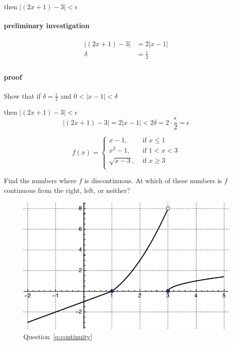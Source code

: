 \documentclass[letterpaper, landscape]{exam}
\begin{document}
\begin{questions}
\begin{solution}
        then $|(2x + 1) - 3| < \epsilon$

        \paragraph{preliminary investigation}
        \begin{align*}
          |(2x + 1) - 3| & = 2|x - 1| \\
          \delta         & = \frac{\epsilon}{2} \\
        \end{align*}

        \paragraph{proof}
        Show that if $\delta = \frac{\epsilon}{2}$ and $0 < |x - 1| < \delta$

        then $|(2x + 1) - 3| < \epsilon$
        \[
          |(2x + 1) - 3| = 2|x - 1| < 2 \delta = 2 \cdot \frac{\epsilon}{2} = \epsilon
        \]
        
      \end{solution}

    \ifprintanswers
      \newpage
    \fi

    \question[10]
    \label{q:continuity}
      \[
          f(x) =
            \begin{cases}
              x - 1,        & \text{ if } x \leq 1 \\
              x^2 - 1,      & \text{ if } 1 < x < 3 \\
              \sqrt{x - 3}, & \text{ if } x \geq 3 \\
            \end{cases}
      \]

      Find the numbers where $f$ is discontinuous. At which of these numbers is $f$
      continuous from the right, left, or neither?

      \begin{solution}
        \begin{figure}[H]
          \centering
          \includegraphics[scale = 0.5]{continuity.pdf}
          \caption{Question~\ref{q:continuity}}
          \label{fig:continuity}
        \end{figure}


\end{solution}
\end{questions}
\end{document}
